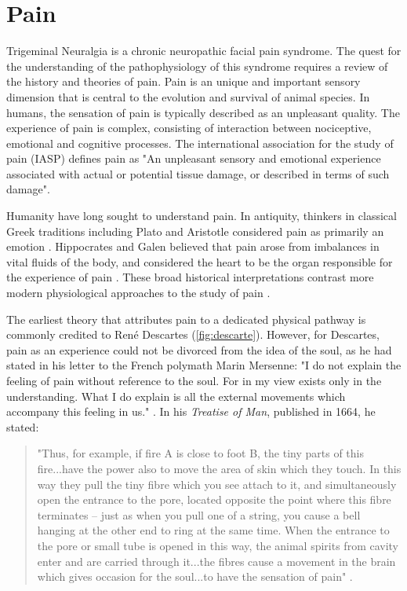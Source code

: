 \section{Pain}

Trigeminal Neuralgia is a chronic neuropathic facial pain syndrome. The quest for the understanding of the pathophysiology of this syndrome requires a review of the history and theories of pain. Pain is an unique and important sensory dimension that is central to the evolution and survival of animal species. In humans, the sensation of pain is typically described as an unpleasant quality. The experience of pain is complex, consisting of interaction between nociceptive, emotional and cognitive processes. The international association for the study of pain (IASP) defines pain as "An unpleasant sensory and emotional experience associated with actual or potential tissue damage, or described in terms of such damage"\cite{Merskey2012}. 

Humanity have long sought to understand pain. In antiquity, thinkers in classical Greek traditions including Plato and Aristotle considered pain as primarily an emotion \cite{Moayedi2012a}. Hippocrates and Galen believed that pain arose from imbalances in vital fluids of the body, and considered the heart to be the organ responsible for the experience of pain \cite{Melzack1999}. These broad historical interpretations contrast more modern physiological approaches to the study of pain \cite{Melzack1999,Moayedi2012a}.

The earliest theory that attributes pain to a dedicated physical pathway is commonly credited to Ren\'{e} Descartes (\ref{fig:descarte}). However, for Descartes, pain as an experience  could not be divorced from the idea of the soul, as he had stated in his letter to the French polymath Marin Mersenne: "I do not explain the feeling of pain without reference to the soul. For in my view exists only in the understanding. What I do explain is all the external movements which accompany this feeling in us." \cite[p. 148]{BookCottingham1991v3}. In his \textit{Treatise of Man}, published in 1664, he stated: 
\begin{quote}"Thus, for example, if fire A is close to foot B, the tiny parts of this fire...have the power also to move the area of skin which they touch. In this way they pull the tiny fibre which you see attach to it, and simultaneously open the entrance to the pore, located opposite the point where this fibre terminates -- just as when you pull one of a string, you cause a bell hanging at the other end to ring at the same time. When the entrance to the pore or small tube is opened in this way, the animal spirits from cavity enter and are carried through it...the fibres cause a movement in the brain which gives occasion for the soul...to have the sensation of pain" \cite[p.101-103]{BookCottingham1991v1}.
\end{quote}

